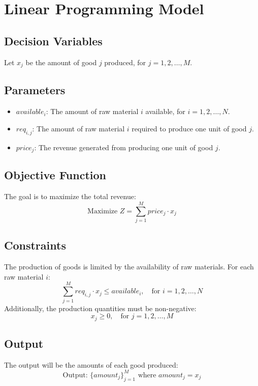 \documentclass{article}
\begin{document}
\section*{Linear Programming Model}

\subsection*{Decision Variables}
Let \( x_j \) be the amount of good \( j \) produced, for \( j = 1, 2, \ldots, M \).

\subsection*{Parameters}
\begin{itemize}
    \item \( available_i \): The amount of raw material \( i \) available, for \( i = 1, 2, \ldots, N \).
    \item \( req_{i,j} \): The amount of raw material \( i \) required to produce one unit of good \( j \).
    \item \( price_j \): The revenue generated from producing one unit of good \( j \).
\end{itemize}

\subsection*{Objective Function}
The goal is to maximize the total revenue:
\[
\text{Maximize } Z = \sum_{j=1}^{M} price_j \cdot x_j
\]

\subsection*{Constraints}
The production of goods is limited by the availability of raw materials. For each raw material \( i \):
\[
\sum_{j=1}^{M} req_{i,j} \cdot x_j \leq available_i, \quad \text{for } i = 1, 2, \ldots, N
\]
Additionally, the production quantities must be non-negative:
\[
x_j \geq 0, \quad \text{for } j = 1, 2, \ldots, M
\]

\subsection*{Output}
The output will be the amounts of each good produced:
\[
\text{Output: } \{ amount_j \}_{j=1}^M \text{ where } amount_j = x_j
\]
\end{document}
